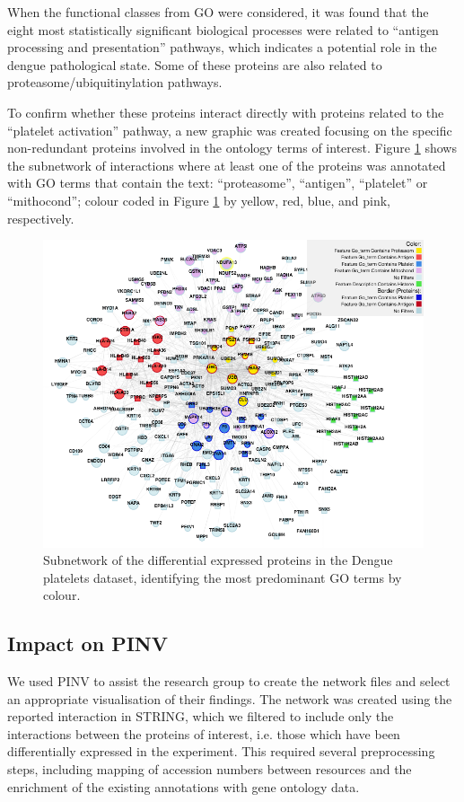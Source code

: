When the functional classes from GO were considered, it was found that the eight most statistically significant biological processes were related to ``antigen processing and presentation'' pathways, which indicates a potential role in the dengue pathological state. Some of these proteins are also related to proteasome/ubiquitinylation pathways.

To confirm whether these proteins interact directly with proteins related to the ``platelet activation'' pathway, a new graphic was created focusing on the specific non-redundant proteins involved in the ontology terms of interest. Figure \ref{fig:pinv_platelets_2} shows the subnetwork of interactions where at least one of the proteins was annotated with GO terms that contain the text: ``proteasome'', ``antigen'', ``platelet'' or ``mithocond''; colour coded in Figure \ref{fig:pinv_platelets_2} by yellow, red, blue, and pink, respectively.

\begin{figure}
\centering
\includegraphics[width=\textwidth]{figures/pinv_platelets_2.png}
\caption[Subnetwork of the differentially expressed proteins identifying the most predominant GO terms.]{Subnetwork of the differential expressed proteins in the Dengue platelets dataset, identifying the most predominant GO terms by colour.
\label{fig:pinv_platelets_2}}
\end{figure}

\subsection{Impact on PINV}
We used PINV to assist the research group to create the network files and select an appropriate visualisation of their findings. The network was created using the reported interaction in STRING, which we filtered to include only the interactions between the proteins of interest, i.e. those which have been differentially expressed in the experiment. This required several preprocessing steps, including mapping of accession numbers between resources and the enrichment of the existing annotations with gene ontology data.

